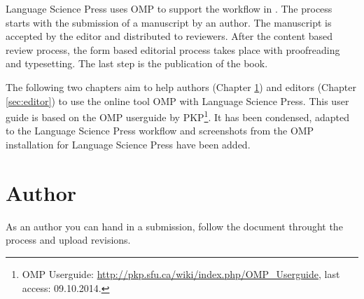 Language Science Press uses OMP to support the workflow in .
The process starts with the submission of a manuscript by an author. The manuscript is accepted by the editor and distributed to reviewers. After the content based review process, the form based editorial process takes place with proofreading and typesetting. The last step is the publication of the book.  

The following two chapters aim to help authors (Chapter \ref{sec:author}) and editors (Chapter \ref{sec:editor}) to use the online tool OMP with Language Science Press. This user guide is based on the OMP userguide by PKP\footnote{OMP Userguide: \url{http://pkp.sfu.ca/wiki/index.php/OMP_Userguide}, last access: 09.10.2014.}. It has been condensed, adapted to the Language Science Press workflow and screenshots from the OMP installation for Language Science Press have been added.






\newpage


\chapter{Author} \label{sec:author}
As an author you can hand in a submission, follow the document throught the process and upload revisions. 


